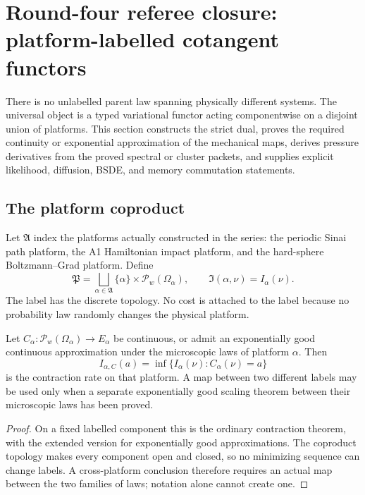 \section{Round-four referee closure: platform-labelled cotangent functors}
\label{sec:r3-c2}

There is no unlabelled parent law spanning physically different systems.  The
universal object is a typed variational functor acting componentwise on a
disjoint union of platforms.  This section constructs the strict dual, proves
the required continuity or exponential approximation of the mechanical
maps, derives pressure derivatives from the proved spectral or cluster
packets, and supplies explicit likelihood, diffusion, BSDE, and memory
commutation statements.

\subsection{The platform coproduct}

Let \(\mathfrak A\) index the platforms actually constructed in the series:
the periodic Sinai path platform, the A1 Hamiltonian impact platform, and the
hard-sphere Boltzmann--Grad platform.  Define
\[
 \mathfrak P
 =\bigsqcup_{\alpha\in\mathfrak A}
 \{\alpha\}\times\mathcal P_w(\Omega_\alpha),
 \qquad
 \mathfrak I(\alpha,\nu)=I_\alpha(\nu).
\]
The label has the discrete topology.  No cost is attached to the label because
no probability law randomly changes the physical platform.

\begin{theorem}
\label{thm:r3-c2-functor}
Let \(C_\alpha:\mathcal P_w(\Omega_\alpha)\to E_\alpha\) be continuous, or
admit an exponentially good continuous approximation under the microscopic
laws of platform \(\alpha\).  Then
\[
 I_{\alpha,C}(a)
 =\inf\{I_\alpha(\nu):C_\alpha(\nu)=a\}
\]
is the contraction rate on that platform.  A map between two different
labels may be used only when a separate exponentially good scaling theorem
between their microscopic laws has been proved.
\end{theorem}

\begin{proof}
On a fixed labelled component this is the ordinary contraction theorem, with
the extended version for exponentially good approximations.  The coproduct
topology makes every component open and closed, so no minimizing sequence can
change labels.  A cross-platform conclusion therefore requires an actual map
between the two families of laws; notation alone cannot create one.
\end{proof}

